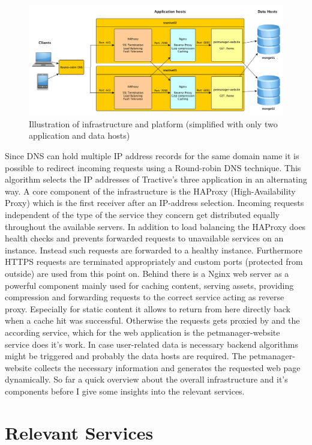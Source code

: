 \begin{figure}[h]
	\centering
		\includegraphics[width=1.0\textwidth]{imgs/architecture.png}
	\caption{Illustration of infrastructure and platform (simplified with only two application and data hosts)}
\end{figure}

Since DNS can hold multiple IP address records for the same domain name it is possible to redirect incoming requests using a Round-robin DNS technique. This algorithm selects the IP addresses of Tractive's three application in an alternating way. A core component of the infrastructure is the HAProxy (High-Availability Proxy) which is the first receiver after an IP-address selection. Incoming requests independent of the type of the service they concern get distributed equally throughout the available servers. In addition to load balancing the HAProxy does health checks and prevents forwarded requests to unavailable services on an instance. Instead such requests are forwarded to a healthy instance. Furthermore HTTPS requests are terminated appropriately and custom ports (protected from outside) are used from this point on. Behind there is a Nginx web server as a powerful component mainly used for caching content, serving assets, providing compression and forwarding requests to the correct service acting as reverse proxy. Especially for static content it allows to return from here directly back when a cache hit was successful. Otherwise the requests gets proxied by and the according service, which for the web application is the petmanager-website service does it's work. In case user-related data is necessary backend algorithms might be triggered and probably the data hosts are required. The petmanager-website collects the necessary information and generates the requested web page dynamically. 
So far a quick overview about the overall infrastructure and it's components before I give some insights into the relevant services. 

\section{Relevant Services}